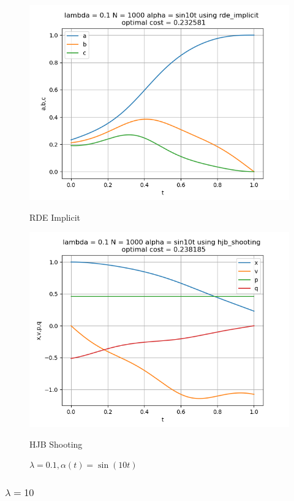 \begin{figure}[H]
	\centering
	\begin{minipage}{0.45\textwidth}
		\centering
		\includegraphics[width=\linewidth]{rde_implicit_l01_alphasin.png}
		\caption{RDE Implicit}
	\end{minipage}
	\hfill
	\begin{minipage}{0.45\textwidth}
		\centering
		\includegraphics[width=\linewidth]{hjb_shooting_l01_alphasin.png}
		\caption{HJB Shooting}
	\end{minipage}
	\caption{$\lambda = 0.1, \alpha(t) = \sin(10 t)$}
\end{figure}

\subsubsection{$\lambda = 10$}

